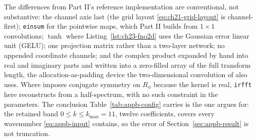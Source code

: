 The differences from Part II's reference implementation are conventional, not
substantive: the channel axis last (the grid layout \eqref{eq:ch21-grid-layout} is
channel-first); \texttt{einsum} for the pointwise maps, which Part II builds from
$1\times1$ convolutions;
$\tanh$ where Listing~\ref{lst:ch23-fno2d} uses the Gaussian error linear unit (GELU);
one projection matrix rather than a two-layer network; no appended coordinate
channels; and the complex product expanded by hand into real and imaginary parts and
written into a zero-filled array of the full transform length, the allocation-as-padding
device the two-dimensional convolution of
 also uses. Where
\cite{li2021fourier} imposes conjugate symmetry on $R_\phi$ because the kernel is
real, \texttt{irfft} here reconstructs from a half-spectrum, with no such constraint
in the parameters. The conclusion Table~\ref{tab:appb-config} carries is the one
 argues for: the retained
band $0\le k\le k_{\max}=11$, twelve coefficients, covers every wavenumber
\eqref{eq:appb-input} contains, so the error of Section~\ref{sec:appb-result} is not
truncation.

